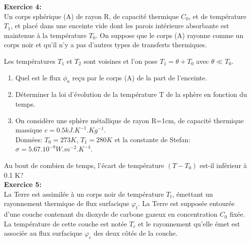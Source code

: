 \documentclass{article}
\begin{document}
\textbf{Exercice 4:}\\
Un corps sphérique (A) de rayon R, de capacité thermique $C_{0}$, et de température $T_{1}$, et placé dans une enceinte vide dont les parois intérieure absorbante est maintenue à la température $T_{0}$. On suppose que le corps (A) rayonne comme un corps noir et qu'il n'y a pas d'autres types de transferts thermiques.\\
\begin{minipage}{.65\textwidth}%
\vspace*{0.4cm}
Les températures $T_{1}$ et $T_{2}$ sont voisines et l'on pose $T_{1}=\theta + T_{0}$ avec $\theta \ll T_{0}$.
\begin{enumerate}
\item Quel est le flux $\phi_{a}$ reçu par le corps (A) de la part de l'enceinte.
\item Déterminer la loi d'évolution de la température T de la sphère en fonction du temps.
\item On considère une sphère métallique de rayon R=1cm, de capacité thermique massique $c=0.5kJ.K^{-1}.Kg^{-1}$.\\
Données: $T_{0}=273K$, $T_{1}=280K$ et la constante de Stefan: \\ $\sigma=5.67.10^{-8}W.m^{-2}.K^{-4}$.
\end{enumerate}
\end{minipage}%
\hfill
\hspace*{1.75cm}
\begin{minipage}{.35\textwidth}%
\end{minipage}%
\vspace*{0.4cm}
Au bout de combien de temps, l'écart de température $(T-T_{0})$ est-il inférieur à 0.1 K?
\\
\textbf{Exercice 5:}\\
La Terre est assimilée à un corps noir de température $T_{t}$, émettant un rayonnement thermique de flux surfacique $\varphi_{t}$. La Terre est supposée entourée d'une couche contenant du dioxyde de carbone gazeux en concentration $C_{0}$ fixée. La température de cette couche est notée $T_{c}$ et le rayonnement qu'elle émet est associée au flux surfacique $\varphi_{c}$ des deux c\^otés  de la couche.\\
\end{document}
